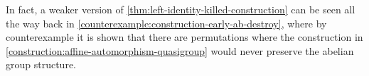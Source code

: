 \begin{remark}
    In fact, a weaker version of \autoref{thm:left-identity-killed-construction} can be seen all the way back in \autoref{counterexample:construction-early-ab-destroy}, where by counterexample it is shown that there are permutations where the construction in \autoref{construction:affine-automorphism-quasigroup} would never preserve the abelian group structure.
\end{remark}